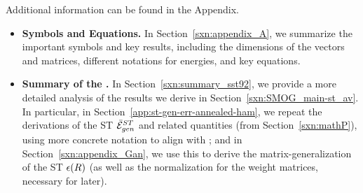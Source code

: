 \noindent
Additional information can be found in the Appendix.
\begin{itemize} %
\item
  \textbf{Symbols and Equations.}
  In Section~\ref{sxn:appendix_A}, we summarize the important symbols and key results,
         including the dimensions of the vectors and matrices, different notations for energies,
         and key equations.
   \item
   \textbf{Summary of the \SMOG.}
         In Section~\ref{sxn:summary_sst92}, we provide a more detailed analysis of the results we derive in Section~\ref{sxn:SMOG_main-st_av}.
         In particular, in Section~\ref{app:st-gen-err-annealed-ham}, we repeat the derivations of the ST \GeneralizationError $\bar{\mathcal{E}}^{ST}_{gen}$ and related quantities (from Section~\ref{sxn:mathP}),
         using more concrete notation to align with \cite{SST90, SST92}; and
         in Section~\ref{sxn:appendix_Gan}, we use this to derive the matrix-generalization of the ST \EffectivePotential $\epsilon(R)$ (as well as the normalization for the weight matrices, necessary for later).
\end{itemize} %





%


